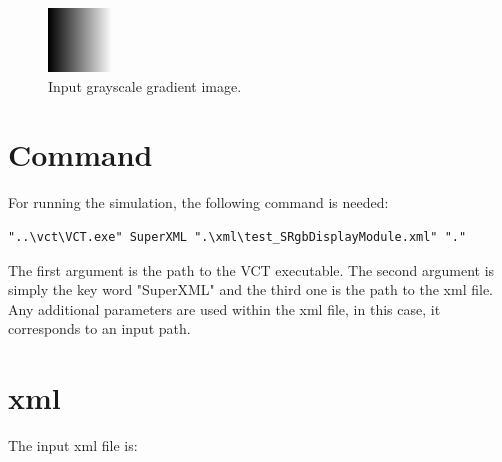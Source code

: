 \begin{figure}[!htb]
\begin{center}
\includegraphics[width=0.5\columnwidth]{./01_Apply3x1DLutModule/images/24RGBL.png}
\caption{Input grayscale gradient image.}\label{fig:gradient2RGB}
\end{center}
\end{figure}

\section{Command}

For running the simulation, the following command is needed:

\lstset{language=C++}
\begin{lstlisting}
"..\vct\VCT.exe" SuperXML ".\xml\test_SRgbDisplayModule.xml" "."
\end{lstlisting}

The first argument is the path to the VCT executable. The second argument is simply the key word "SuperXML" and the third one is the path to the xml file. Any additional parameters are used within the xml file, in this case, it corresponds to an input path.

\section{xml}

The input xml file is:


